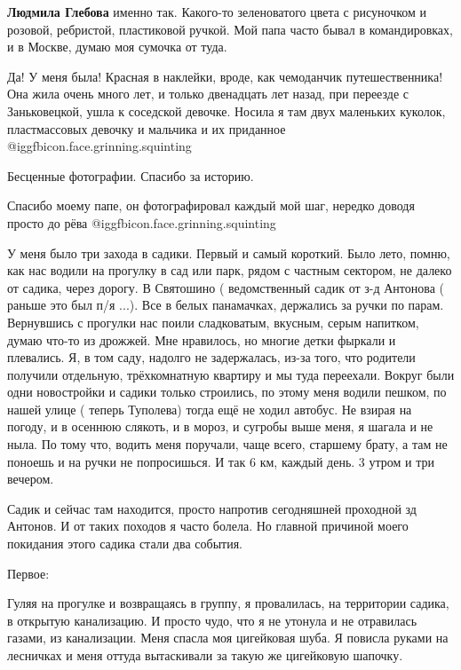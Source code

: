 \begin{itemize}
\begin{itemize}
\begin{itemize}
\textbf{Людмила Глебова} именно так. Какого-то зеленоватого цвета с рисуночком и розовой, ребристой, пластиковой ручкой.
Мой папа часто бывал в командировках, и в Москве, думаю моя сумочка от туда.
\end{itemize} %


Да! У меня была! Красная в наклейки, вроде, как чемоданчик путешественника! Она
жила очень много лет, и только двенадцать лет назад, при переезде с
Заньковецкой, ушла к соседской девочке. Носила я там двух маленьких куколок,
пластмассовых девочку и мальчика и их приданное @igg{fbicon.face.grinning.squinting} 

\end{itemize} %

Бесценные фотографии. Спасибо за историю.

Спасибо моему папе, он фотографировал каждый мой шаг, нередко доводя просто до рёва  @igg{fbicon.face.grinning.squinting} 


У меня было три захода в садики. Первый и самый короткий. Было лето, помню, как
нас водили на прогулку в сад или парк, рядом с частным сектором, не далеко от
садика, через дорогу. В Святошино ( ведомственный садик от з-д Антонова (
раньше это был п/я ...). Все в белых панамачках, держались за ручки по парам.
Вернувшись с прогулки нас поили сладковатым, вкусным, серым напитком, думаю
что-то из дрожжей. Мне нравилось, но многие детки фыркали и плевались. Я, в том
саду, надолго не задержалась, из-за того, что родители получили отдельную,
трёхкомнатную квартиру и мы туда переехали. Вокруг были одни новостройки и
садики только строились, по этому меня водили пешком, по нашей улице ( теперь
Туполева) тогда ещё не ходил автобус. Не взирая на погоду, и в осеннюю слякоть,
и в мороз, и сугробы выше меня, я шагала и не ныла. По тому что, водить меня
поручали, чаще всего, старшему брату, а там не поноешь и на ручки не
попросишься. И так 6 км, каждый день. 3 утром и три вечером.

Садик и сейчас там находится, просто напротив сегодняшней проходной зд Антонов.
И от таких походов я часто болела. Но главной причиной моего покидания этого
садика стали два события. 

Первое:

Гуляя на прогулке и возвращаясь в группу, я провалилась, на территории садика,
в открытую канализацию. И просто чудо, что я не утонула и не отравилась газами,
из канализации. Меня спасла моя цигейковая шуба. Я повисла руками на лесничках
и меня оттуда вытаскивали за такую же цигейковую шапочку. 


\end{itemize}
